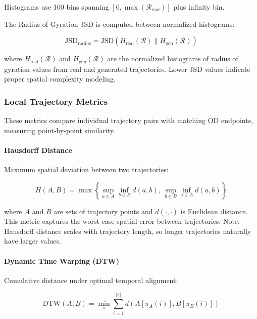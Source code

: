 Histograms use 100 bins spanning $[0, \max(\mathcal{R}_{\text{real}})]$ plus infinity bin.

The Radius of Gyration JSD is computed between normalized histograms:

\begin{equation}
    \text{JSD}_{\text{radius}} = \text{JSD}(H_{\text{real}}(\mathcal{R}) \parallel H_{\text{gen}}(\mathcal{R}))
    \label{eq:radius-jsd}
\end{equation}

where $H_{\text{real}}(\mathcal{R})$ and $H_{\text{gen}}(\mathcal{R})$ are the normalized histograms of radius of gyration values from real and generated trajectories. Lower JSD values indicate proper spatial complexity modeling.

\subsubsection{Local Trajectory Metrics}
\label{app:local-metrics}

These metrics compare individual trajectory pairs with matching OD endpoints, measuring point-by-point similarity.

\paragraph{Hausdorff Distance}

Maximum spatial deviation between two trajectories:

\begin{equation}
    H(A, B) = \max \left\{ \sup_{a \in A} \inf_{b \in B} d(a, b), \, \sup_{b \in B} \inf_{a \in A} d(a, b) \right\}
    \label{eq:hausdorff-appendix}
\end{equation}

where $A$ and $B$ are sets of trajectory points and $d(\cdot, \cdot)$ is Euclidean distance. This metric captures the worst-case spatial error between trajectories. Note: Hausdorff distance scales with trajectory length, so longer trajectories naturally have larger values.

\paragraph{Dynamic Time Warping (DTW)}

Cumulative distance under optimal temporal alignment:

\begin{equation}
    \text{DTW}(A, B) = \min_{\pi} \sum_{i=1}^{|\pi|} d(A[\pi_A(i)], B[\pi_B(i)])
    \label{eq:dtw-appendix}
\end{equation}

